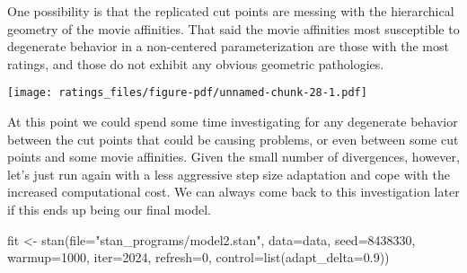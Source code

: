 \documentclass[
  letterpaper,
  DIV=11,
  numbers=noendperiod]{scrartcl}
\newenvironment{Shaded}{\begin{snugshade}}{\end{snugshade}}
\newcommand{\AttributeTok}[1]{\textcolor[rgb]{0.40,0.45,0.13}{#1}}
\newcommand{\ControlFlowTok}[1]{\textcolor[rgb]{0.00,0.23,0.31}{#1}}
\newcommand{\DecValTok}[1]{\textcolor[rgb]{0.68,0.00,0.00}{#1}}
\newcommand{\FloatTok}[1]{\textcolor[rgb]{0.68,0.00,0.00}{#1}}
\newcommand{\FunctionTok}[1]{\textcolor[rgb]{0.28,0.35,0.67}{#1}}
\newcommand{\NormalTok}[1]{\textcolor[rgb]{0.00,0.23,0.31}{#1}}
\newcommand{\OtherTok}[1]{\textcolor[rgb]{0.00,0.23,0.31}{#1}}
\newcommand{\SpecialCharTok}[1]{\textcolor[rgb]{0.37,0.37,0.37}{#1}}
\newcommand{\StringTok}[1]{\textcolor[rgb]{0.13,0.47,0.30}{#1}}
\begin{document}
One possibility is that the replicated cut points are messing with the
hierarchical geometry of the movie affinities. That said the movie
affinities most susceptible to degenerate behavior in a non-centered
parameterization are those with the most ratings, and those do not
exhibit any obvious geometric pathologies.

\begin{Shaded}
\end{Shaded}

\texttt{[image: ratings\_files/figure-pdf/unnamed-chunk-28-1.pdf]}

At this point we could spend some time investigating for any degenerate
behavior between the cut points that could be causing problems, or even
between some cut points and some movie affinities. Given the small
number of divergences, however, let's just run again with a less
aggressive step size adaptation and cope with the increased
computational cost. We can always come back to this investigation later
if this ends up being our final model.

\begin{Shaded}
\begin{Highlighting}[]
\NormalTok{fit }\OtherTok{\textless{}{-}} \FunctionTok{stan}\NormalTok{(}\AttributeTok{file=}\StringTok{"stan\_programs/model2.stan"}\NormalTok{,}
            \AttributeTok{data=}\NormalTok{data, }\AttributeTok{seed=}\DecValTok{8438330}\NormalTok{,}
            \AttributeTok{warmup=}\DecValTok{1000}\NormalTok{, }\AttributeTok{iter=}\DecValTok{2024}\NormalTok{, }\AttributeTok{refresh=}\DecValTok{0}\NormalTok{,}
            \AttributeTok{control=}\FunctionTok{list}\NormalTok{(}\StringTok{\textquotesingle{}adapt\_delta\textquotesingle{}}\OtherTok{=}\FloatTok{0.9}\NormalTok{))}
\end{Highlighting}
\end{Shaded}
\end{document}
